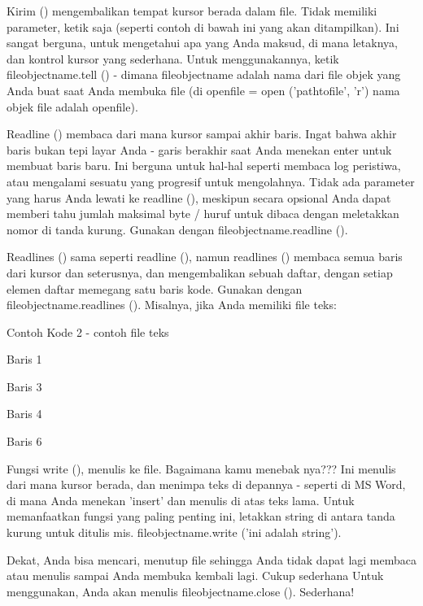 Kirim () mengembalikan tempat kursor berada dalam file. Tidak memiliki parameter, ketik saja (seperti contoh di bawah ini yang akan ditampilkan). Ini sangat berguna, untuk mengetahui apa yang Anda maksud, di mana letaknya, dan kontrol kursor yang sederhana. Untuk menggunakannya, ketik fileobjectname.tell () - dimana fileobjectname adalah nama dari file objek yang Anda buat saat Anda membuka file (di openfile = open ('pathtofile', 'r') nama objek file adalah openfile). \par
\vspace{12pt}
Readline () membaca dari mana kursor sampai akhir baris. Ingat bahwa akhir baris bukan tepi layar Anda - garis berakhir saat Anda menekan enter untuk membuat baris baru. Ini berguna untuk hal-hal seperti membaca log peristiwa, atau mengalami sesuatu yang progresif untuk mengolahnya. Tidak ada parameter yang harus Anda lewati ke readline (), meskipun secara opsional Anda dapat memberi tahu jumlah maksimal byte / huruf untuk dibaca dengan meletakkan nomor di tanda kurung. Gunakan dengan fileobjectname.readline (). \par
\vspace{12pt}
Readlines () sama seperti readline (), namun readlines () membaca semua baris dari kursor dan seterusnya, dan mengembalikan sebuah daftar, dengan setiap elemen daftar memegang satu baris kode. Gunakan dengan fileobjectname.readlines (). Misalnya, jika Anda memiliki file teks: \par
Contoh Kode 2 - contoh file teks \par
\vspace{12pt}
Baris 1 \par
\vspace{12pt}
Baris 3 \par
Baris 4 \par
\vspace{12pt}
Baris 6 \par
\vspace{12pt}
Fungsi write (), menulis ke file. Bagaimana kamu menebak nya??? Ini menulis dari mana kursor berada, dan menimpa teks di depannya - seperti di MS Word, di mana Anda menekan 'insert' dan menulis di atas teks lama. Untuk memanfaatkan fungsi yang paling penting ini, letakkan string di antara tanda kurung untuk ditulis mis. fileobjectname.write ('ini adalah string'). \par
\vspace{12pt}
Dekat, Anda bisa mencari, menutup file sehingga Anda tidak dapat lagi membaca atau menulis sampai Anda membuka kembali lagi. Cukup sederhana Untuk menggunakan, Anda akan menulis fileobjectname.close (). Sederhana! \par
